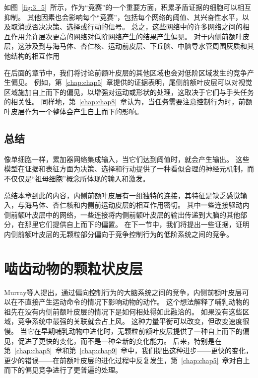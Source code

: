 如图~\ref{fig:3_5}~所示，作为“竞赛”的一个重要方面，积累矛盾证据的细胞可以相互抑制。
其他因素也会影响每个“竞赛”，包括每个网络的阈值、其兴奋性水平，以及取消或否决决策、选择或行动的信号。
总之，这些网络中的许多网络之间的相互作用允许层次更高的网络对低阶网络产生的结果产生偏见。
对于内侧前额叶皮层，这涉及到与海马体、杏仁核、运动前皮层、下丘脑、中脑导水管周围灰质和其他结构的相互作用\par


在后面的章节中，我们将讨论前额叶皮层的其他区域也会对低阶区域发生的竞争产生偏见。
例如，第~\ref{chap:chap5}~章提供的证据表明，尾侧前额叶皮层可以对视觉区域施加自上而下的偏见，以增强对运动或形状的处理，这取决于它们与手头任务的相关性。
同样地，第~\ref{chap:chap8}~章认为，当任务需要注意控制行为时，前额叶皮层作为一个整体会产生自上而下的影响。\par



\subsection{总结}

像单细胞一样，累加器网络集成输入，当它们达到阈值时，就会产生输出。
这些模型在证据和表征方面为决策、选择和行动提供了一种看似合理的神经元机制，而不仅仅是“祖母细胞”概念所体现的输入和激发。\par


总结本章到此的内容，内侧前额叶皮层有一组独特的连接，其特征是缺乏感觉输入，与海马体、杏仁核和内侧前运动皮层的相互作用密切。
其中一些连接驱动内侧前额叶皮层中的网络，一些连接将内侧前额叶皮层的输出传递到大脑的其他部分，在那里它们提供自上而下的偏置。
在下一节中，我们将提出一些证据，证明内侧前额叶皮层的无颗粒部分偏向于竞争控制行为的低阶系统之间的竞争。\par



\section{啮齿动物的颗粒状皮层}

Murray等人\cite{murray2011can}提出，通过偏向控制行为的大脑系统之间的竞争，内侧前额叶皮层可以在不直接产生运动命令的情况下影响动物的动作。
这个想法解释了哺乳动物的祖先在没有内侧前额叶皮层的情况下是如何相处得如此融洽的。
如果没有这些区域，竞争系统中最强的关联就会占上风。 这种力量平衡可以改变，但改变速度很慢。
当它在早期哺乳动物中进化时，无颗粒前额叶皮层提供了一种自上而下的偏见，促进了更快的变化，而不是一种全新的变化能力。
后来，特别是在第~\ref{chap:chap8}~章和第~\ref{chap:chap9}~章中，我们提出这种进步——更快的变化，更少的错误——在前额叶皮层的进化过程中反复发生，第~\ref{chap:chap5}~章对自上而下的偏见竞争进行了更普遍的处理。\par



